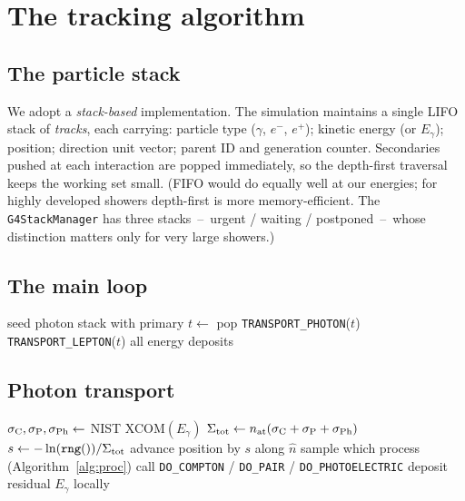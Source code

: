 \documentclass[11pt,a4paper]{article}
\newcommand{\Eg}{E_\gamma}
\newcommand{\Egcut}{\Eg^{\rm cut}}
\begin{document}
\section{The tracking algorithm}\label{sec:algo}

\subsection{The particle stack}

We adopt a \emph{stack-based} implementation. The simulation
maintains a single LIFO stack of \emph{tracks}, each carrying:
particle type ($\gamma$, $e^-$, $e^+$); kinetic energy (or $\Eg$);
position; direction unit vector; parent ID and generation counter.
Secondaries pushed at each interaction are popped immediately,
so the depth-first traversal keeps the working set small. (FIFO
would do equally well at our energies; for highly developed
showers depth-first is more memory-efficient. The
\verb|G4StackManager| has three stacks~--~urgent / waiting /
postponed~--~whose distinction matters only for very large
showers.)

\subsection{The main loop}

\begin{algorithm}[H]
\caption{Main tracking loop.}
\begin{algorithmic}[1]
  \State seed photon stack with primary
    \State $t \gets$ pop
      \State \texttt{TRANSPORT\_PHOTON}($t$)
    \Else
      \State \texttt{TRANSPORT\_LEPTON}($t$)
    \EndIf
  \EndWhile
  \State \Return all energy deposits
\end{algorithmic}
\end{algorithm}

\subsection{Photon transport}

\begin{algorithm}[H]
\caption{\texttt{TRANSPORT\_PHOTON}.}
\begin{algorithmic}[1]
  \While{$\Eg \ge \Egcut$}
    \State $\sigma_{\rm C}, \sigma_{\rm P}, \sigma_{\rm Ph} \gets$
            \textsc{NIST XCOM}$(\Eg)$
    \State $\Sigma_{\rm tot}\gets n_{\rm at}(\sigma_{\rm C}+\sigma_{\rm P}+\sigma_{\rm Ph})$
    \State $s\gets -\ln(\texttt{rng}())/\Sigma_{\rm tot}$
    \State advance position by $s$ along $\hat n$
     \State \Return \EndIf
    \State sample which process (Algorithm~\ref{alg:proc})
    \State call \texttt{DO\_COMPTON} / \texttt{DO\_PAIR} /
                \texttt{DO\_PHOTOELECTRIC}
     \State \Return \EndIf
  \EndWhile
  \State deposit residual $\Eg$ locally
\end{algorithmic}
\end{algorithm}
\end{document}
